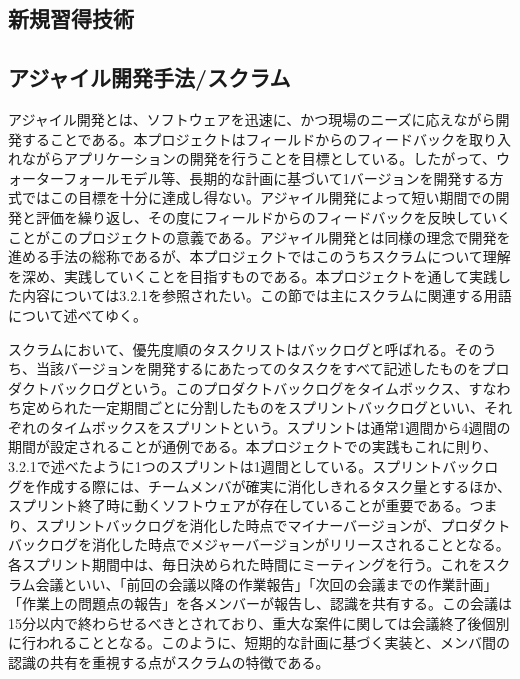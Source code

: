\documentclass[openany,11pt,papersize]{jsbook}
\begin{document}
\begin{appendix}
\chapter{新規習得技術}
\section{アジャイル開発手法/スクラム}
アジャイル開発とは、ソフトウェアを迅速に、かつ現場のニーズに応えながら開発することである。本プロジェクトはフィールドからのフィードバックを取り入れながらアプリケーションの開発を行うことを目標としている。したがって、ウォーターフォールモデル等、長期的な計画に基づいて1バージョンを開発する方式ではこの目標を十分に達成し得ない。アジャイル開発によって短い期間での開発と評価を繰り返し、その度にフィールドからのフィードバックを反映していくことがこのプロジェクトの意義である。アジャイル開発とは同様の理念で開発を進める手法の総称であるが、本プロジェクトではこのうちスクラムについて理解を深め、実践していくことを目指すものである。本プロジェクトを通して実践した内容については3.2.1を参照されたい。この節では主にスクラムに関連する用語について述べてゆく。\par
スクラムにおいて、優先度順のタスクリストはバックログと呼ばれる。そのうち、当該バージョンを開発するにあたってのタスクをすべて記述したものをプロダクトバックログという。このプロダクトバックログをタイムボックス、すなわち定められた一定期間ごとに分割したものをスプリントバックログといい、それぞれのタイムボックスをスプリントという。スプリントは通常1週間から4週間の期間が設定されることが通例である。本プロジェクトでの実践もこれに則り、3.2.1で述べたように1つのスプリントは1週間としている。スプリントバックログを作成する際には、チームメンバが確実に消化しきれるタスク量とするほか、スプリント終了時に動くソフトウェアが存在していることが重要である。つまり、スプリントバックログを消化した時点でマイナーバージョンが、プロダクトバックログを消化した時点でメジャーバージョンがリリースされることとなる。各スプリント期間中は、毎日決められた時間にミーティングを行う。これをスクラム会議といい、「前回の会議以降の作業報告」「次回の会議までの作業計画」「作業上の問題点の報告」を各メンバーが報告し、認識を共有する。この会議は15分以内で終わらせるべきとされており、重大な案件に関しては会議終了後個別に行われることとなる。このように、短期的な計画に基づく実装と、メンバ間の認識の共有を重視する点がスクラムの特徴である。



\end{appendix}
\end{document}
